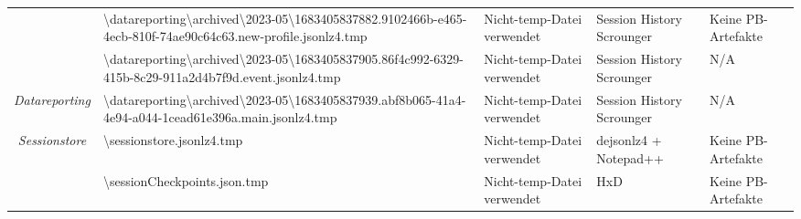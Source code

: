\begin{appendices}
{\begin{landscape}
\begin{table}[h!]
{\begin{tabular}{cllll}
	\multicolumn{1}{|c|}{}                                                                                       & \multicolumn{1}{l|}{\cellcolor[HTML]{3190FF}\textbackslash{}datareporting\textbackslash{}archived\textbackslash{}2023-05\textbackslash{}1683405837882.9102466b-e465-4ecb-810f-74ae90c64c63.new-profile.jsonlz4.tmp} & \multicolumn{1}{l|}{\cellcolor[HTML]{FCFF2F}Nicht-temp-Datei verwendet}                           & \multicolumn{1}{l|}{Session History Scrounger}   & \multicolumn{1}{l|}{\cellcolor[HTML]{F8A102}Keine PB-Artefakte} \\ \cline{2-5} 
	\multicolumn{1}{|c|}{}                                                                                       & \multicolumn{1}{l|}{\cellcolor[HTML]{3190FF}\textbackslash{}datareporting\textbackslash{}archived\textbackslash{}2023-05\textbackslash{}1683405837905.86f4c992-6329-415b-8c29-911a2d4b7f9d.event.jsonlz4.tmp}       & \multicolumn{1}{l|}{\cellcolor[HTML]{FCFF2F}Nicht-temp-Datei verwendet}                           & \multicolumn{1}{l|}{Session History Scrounger}   & \multicolumn{1}{l|}{\cellcolor[HTML]{C0C0C0}N/A}                \\ \cline{2-5} 
	\multicolumn{1}{|c|}{\multirow{-4}{*}{\textit{Datareporting}}}                                               & \multicolumn{1}{l|}{\cellcolor[HTML]{3190FF}\textbackslash{}datareporting\textbackslash{}archived\textbackslash{}2023-05\textbackslash{}1683405837939.abf8b065-41a4-4e94-a044-1cead61e396a.main.jsonlz4.tmp}        & \multicolumn{1}{l|}{\cellcolor[HTML]{FCFF2F}Nicht-temp-Datei verwendet}                           & \multicolumn{1}{l|}{Session History Scrounger}   & \multicolumn{1}{l|}{\cellcolor[HTML]{C0C0C0}N/A}                \\ \hline
	\multicolumn{1}{|c|}{\textit{Sessionstore}}                                                                  & \multicolumn{1}{l|}{\cellcolor[HTML]{3190FF}\textbackslash{}sessionstore.jsonlz4.tmp}                                                                                                                               & \multicolumn{1}{l|}{\cellcolor[HTML]{FCFF2F}Nicht-temp-Datei verwendet}                           & \multicolumn{1}{l|}{dejsonlz4 + Notepad++}       & \multicolumn{1}{l|}{\cellcolor[HTML]{F8A102}Keine PB-Artefakte} \\ \hline
	\multicolumn{1}{|c|}{}                                                                                       & \multicolumn{1}{l|}{\cellcolor[HTML]{3190FF}\textbackslash{}sessionCheckpoints.json.tmp}                                                                                                                            & \multicolumn{1}{l|}{\cellcolor[HTML]{FCFF2F}Nicht-temp-Datei verwendet}                           & \multicolumn{1}{l|}{HxD}                         & \multicolumn{1}{l|}{\cellcolor[HTML]{F8A102}Keine PB-Artefakte} \\ \cline{2-5} 

\end{tabular}}
\end{table}
\end{landscape}}
\end{appendices}
